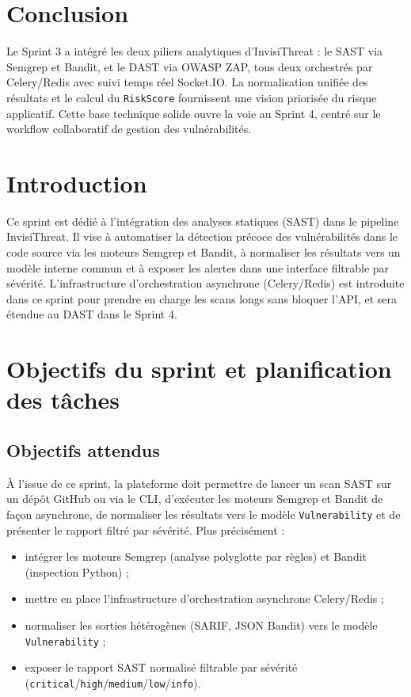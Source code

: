 \section{Conclusion}
Le Sprint 3 a intégré les deux piliers analytiques d'InvisiThreat : le SAST via Semgrep et Bandit, et le DAST via OWASP ZAP, tous deux orchestrés par Celery/Redis avec suivi temps réel Socket.IO. La normalisation unifiée des résultats et le calcul du \texttt{RiskScore} fournissent une vision priorisée du risque applicatif. Cette base technique solide ouvre la voie au Sprint 4, centré sur le workflow collaboratif de gestion des vulnérabilités.

\section{Introduction}
Ce sprint est dédié à l'intégration des analyses statiques (SAST) dans le pipeline InvisiThreat. Il vise à automatiser la détection précoce des vulnérabilités dans le code source via les moteurs Semgrep et Bandit, à normaliser les résultats vers un modèle interne commun et à exposer les alertes dans une interface filtrable par sévérité. L'infrastructure d'orchestration asynchrone (Celery/Redis) est introduite dans ce sprint pour prendre en charge les scans longs sans bloquer l'API, et sera étendue au DAST dans le Sprint 4.

\section{Objectifs du sprint et planification des tâches}

\subsection{Objectifs attendus}
À l'issue de ce sprint, la plateforme doit permettre de lancer un scan SAST sur un dépôt GitHub ou via le CLI, d'exécuter les moteurs Semgrep et Bandit de façon asynchrone, de normaliser les résultats vers le modèle \texttt{Vulnerability} et de présenter le rapport filtré par sévérité. Plus précisément :
\begin{itemize}
  \item intégrer les moteurs Semgrep (analyse polyglotte par règles) et Bandit (inspection Python) ;
  \item mettre en place l'infrastructure d'orchestration asynchrone Celery/Redis ;
  \item normaliser les sorties hétérogènes (SARIF, JSON Bandit) vers le modèle \texttt{Vulnerability} ;
  \item exposer le rapport SAST normalisé filtrable par sévérité (\texttt{critical}/\texttt{high}/\texttt{medium}/\texttt{low}/\texttt{info}).
\end{itemize}

